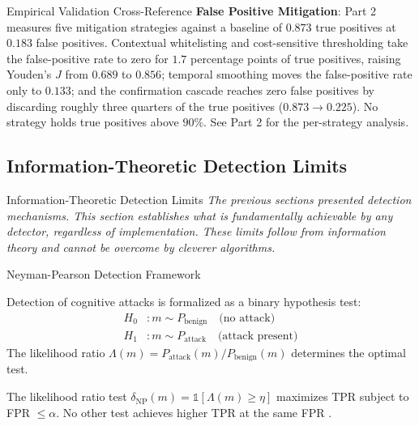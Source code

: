 \documentclass[
  ignorenonframetext,
]{beamer}
\begin{document}
\begin{frame}[allowframebreaks]{Empirical Validation Cross-Reference}
\textbf{False Positive Mitigation}: Part 2 measures five mitigation
strategies against a baseline of \(0.873\) true positives at \(0.183\)
false positives. Contextual whitelisting and cost-sensitive thresholding
take the false-positive rate to zero for \(1.7\) percentage points of
true positives, raising Youden's \(J\) from \(0.689\) to \(0.856\);
temporal smoothing moves the false-positive rate only to \(0.133\); and
the confirmation cascade reaches zero false positives by discarding
roughly three quarters of the true positives (\(0.873 \to 0.225\)). No
strategy holds true positives above \(90\%\). See Part 2 for the
per-strategy analysis.
\end{frame}

\subsection{Information-Theoretic Detection
Limits}\label{sec:it-detection-limits}

\begin{frame}[allowframebreaks]{Information-Theoretic Detection Limits}
\emph{The previous sections presented detection mechanisms. This section
establishes what is fundamentally achievable by any detector, regardless
of implementation. These limits follow from information theory and
cannot be overcome by cleverer algorithms.}
\end{frame}

\begin{frame}[allowframebreaks]{Neyman-Pearson Detection Framework}
\protect{}\label{neyman-pearson-detection-framework}
\begin{definition}
\label{def:hyp-test}
Detection of cognitive attacks is formalized as a binary hypothesis test:
\begin{align}
\label{eq:hyp-test}
H_0 &: m \sim P_{\text{benign}} \quad \text{(no attack)} \\
H_1 &: m \sim P_{\text{attack}} \quad \text{(attack present)}
\end{align}
The likelihood ratio $\Lambda(m) = P_{\text{attack}}(m) / P_{\text{benign}}(m)$ determines the optimal test.
\end{definition}

\begin{theorem}
\label{thm:np-detector}
The likelihood ratio test $\delta_{\text{NP}}(m) = \mathbb{1}[\Lambda(m) \geq \eta]$ maximizes TPR subject to FPR $\leq \alpha$. No other test achieves higher TPR at the same FPR \cite{neyman1933ix}.
\end{theorem}

\end{frame}
\end{document}
